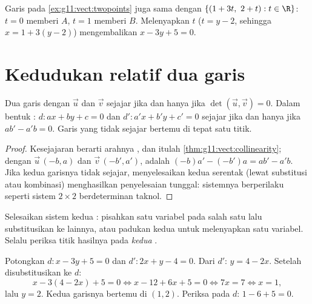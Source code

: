\begin{example}
Garis pada \cref{ex:g11:vect:twopoints} juga sama dengan
$\{(1 + 3t,\ 2 + t) : t \in \R\}$: $t = 0$ memberi $A$, $t = 1$ memberi $B$.
Melenyapkan $t$ ($t = y - 2$, sehingga $x = 1 + 3(y-2)$) mengembalikan
$x - 3y + 5 = 0$.
\end{example}

\section{Kedudukan relatif dua garis}

\begin{proposition}\label{prop:g11:vect:positions}
Dua garis dengan  $\vec u$ dan $\vec v$ sejajar jika dan
hanya jika $\det(\vec u, \vec v) = 0$. Dalam bentuk :
$d : ax + by + c = 0$ dan $d' : a'x + b'y + c' = 0$ sejajar jika dan hanya jika
$ab' - a'b = 0$. Garis yang tidak sejajar bertemu di tepat satu titik.
\end{proposition}

\begin{proof}
Kesejajaran berarti arahnya , dan itulah
\cref{thm:g11:vect:collinearity}; dengan $\vec u\,(-b, a)$ dan
$\vec v\,(-b', a')$,  adalah $(-b)a' - (-b')a = ab' - a'b$.
Jika kedua garisnya tidak sejajar, menyelesaikan kedua  serentak
(lewat substitusi atau kombinasi) menghasilkan penyelesaian tunggal: sistemnya
berperilaku seperti sistem $2 \times 2$ berdeterminan taknol.
\end{proof}

\begin{method}\label{met:g11:vect:intersection}
Selesaikan sistem kedua : pisahkan satu variabel pada salah satu
 lalu substitusikan ke  lainnya, atau padukan kedua
 untuk melenyapkan satu variabel. Selalu periksa titik hasilnya
pada \emph{kedua} .
\end{method}

\begin{example}\label{ex:g11:vect:intersection}
Potongkan $d: x - 3y + 5 = 0$ dan $d': 2x + y - 4 = 0$. Dari $d'$:
$y = 4 - 2x$. Setelah disubstitusikan ke $d$:
\[
x - 3(4 - 2x) + 5 = 0
\iff x - 12 + 6x + 5 = 0
\iff 7x = 7
\iff x = 1,
\]
lalu $y = 2$. Kedua garisnya bertemu di $(1, 2)$. Periksa pada $d$: $1 - 6 + 5 = 0$.
\end{example}

